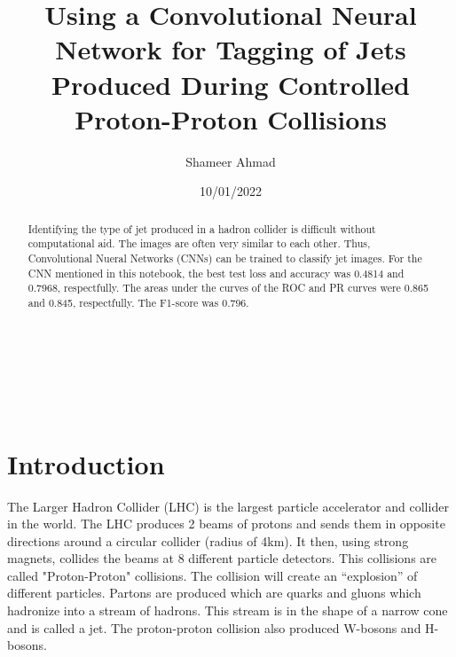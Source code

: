\documentclass[11pt, a4page]{article}
\title{Using a Convolutional Neural Network for Tagging of Jets Produced During Controlled Proton-Proton Collisions}
\author{Shameer Ahmad}
\date{10/01/2022}
\begin{document}
\maketitle
{}\\
\\
\\

\vspace{10cm}



\begin{abstract}

Identifying the type of jet produced in a hadron collider is difficult without computational aid. The images are often very similar to each other. Thus, Convolutional Nueral Networks (CNNs) can be trained to classify jet images. For the CNN mentioned in this notebook, the best test loss and accuracy was 0.4814 and 0.7968, respectfully. The areas under the curves of the ROC and PR curves were 0.865 and 0.845, respectfully. The F1-score was 0.796. 

\end{abstract}

\pagebreak
\tableofcontents

\pagebreak

\centering
\justifying
\section{Introduction}
\justifying
\vspace{1cm}
The Larger Hadron Collider (LHC) is the largest particle accelerator and collider in the world. The LHC produces 2 beams of protons and sends them in opposite directions around a circular collider (radius of 4km). It then, using strong magnets, collides the beams at 8 different particle detectors. This collisions are called "Proton-Proton" collisions. The collision will create an “explosion” of different particles. Partons are produced which are quarks and gluons which hadronize into a stream of hadrons. This stream is in the shape of a narrow cone and is called a jet. The proton-proton collision also produced W-bosons and H-bosons. 
\end{document}
